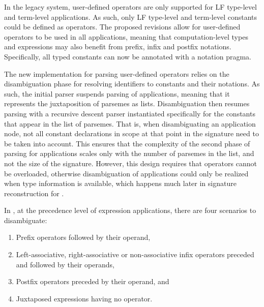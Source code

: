 In the legacy \Beluga system, user-defined operators are only supported for \ac{LF} type-level and term-level applications.
As such, only \ac{LF} type-level and term-level constants could be defined as operators.
The proposed revisions allow for user-defined operators to be used in all applications, meaning that computation-level types and expressions may also benefit from prefix, infix and postfix notations.
Specifically, all typed constants can now be annotated with a notation pragma.

The new implementation for parsing user-defined operators relies on the disambiguation phase for resolving identifiers to constants and their notations.
As such, the initial parser suspends parsing of applications, meaning that it represents the juxtaposition of parsemes as lists.
Disambiguation then resumes parsing with a recursive descent parser instantiated specifically for the constants that appear in the list of parsemes.
That is, when disambiguating an application node, not all constant declarations in scope at that point in the \Beluga signature need to be taken into account.
This ensures that the complexity of the second phase of parsing for applications scales only with the number of parsemes in the list, and not the size of the signature.
However, this design requires that operators cannot be overloaded, otherwise disambiguation of applications could only be realized when type information is available, which happens much later in signature reconstruction for \Beluga.

In \Beluga, at the precedence level of expression applications, there are four scenarios to disambiguate:
\begin{enumerate}
\item Prefix operators followed by their operand,
\item Left-associative, right-associative or non-associative infix operators preceded and followed by their operands,
\item Postfix operators preceded by their operand, and
\item Juxtaposed expressions having no operator.
\end{enumerate}

